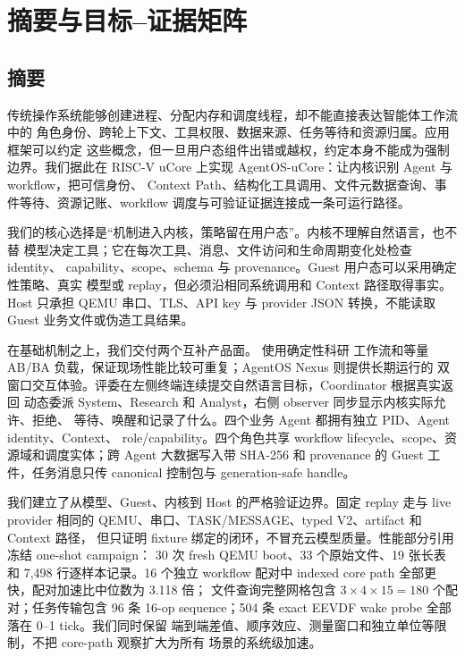 \chapter*{摘要与目标--证据矩阵}

\section*{摘要}

传统操作系统能够创建进程、分配内存和调度线程，却不能直接表达智能体工作流中的
角色身份、跨轮上下文、工具权限、数据来源、任务等待和资源归属。应用框架可以约定
这些概念，但一旦用户态组件出错或越权，约定本身不能成为强制边界。我们据此在
RISC-V uCore 上实现 AgentOS-uCore：让内核识别 Agent 与 workflow，把可信身份、
Context Path、结构化工具调用、文件元数据查询、事件等待、资源记账、workflow
调度与可验证证据连接成一条可运行路径。

我们的核心选择是“机制进入内核，策略留在用户态”。内核不理解自然语言，也不替
模型决定工具；它在每次工具、消息、文件访问和生命周期变化处检查 identity、
capability、scope、schema 与 provenance。Guest 用户态可以采用确定性策略、真实
模型或 replay，但必须沿相同系统调用和 Context 路径取得事实。Host 只承担 QEMU
串口、TLS、API key 与 provider JSON 转换，不能读取 Guest 业务文件或伪造工具结果。

在基础机制之上，我们交付两个互补产品面。 使用确定性科研
工作流和等量 AB/BA 负载，保证现场性能比较可重复；AgentOS Nexus 则提供长期运行的
双窗口交互体验。评委在左侧终端连续提交自然语言目标，Coordinator 根据真实返回
动态委派 System、Research 和 Analyst，右侧 observer 同步显示内核实际允许、拒绝、
等待、唤醒和记录了什么。四个业务 Agent 都拥有独立 PID、Agent identity、Context、
role/capability。四个角色共享 workflow lifecycle、scope、资源域和调度实体；跨 Agent 大数据写入带 SHA-256 和 provenance 的 Guest
工件，任务消息只传 canonical 控制包与 generation-safe handle。

我们建立了从模型、Guest、内核到 Host 的严格验证边界。固定 replay 走与 live
provider 相同的 QEMU、串口、TASK/MESSAGE、typed V2、artifact 和 Context 路径，
但只证明 fixture 绑定的闭环，不冒充云模型质量。性能部分引用冻结 one-shot campaign：
30 次 fresh QEMU boot、33 个原始文件、19 张长表和 7,498 行逐样本记录。16 个独立
workflow 配对中 indexed core path 全部更快，配对加速比中位数为 3.118 倍；
文件查询完整网格包含 $3\times4\times15=180$ 个配对；任务传输包含 96 条
16-op sequence；504 条 exact EEVDF wake probe 全部落在 0--1 tick。我们同时保留
端到端差值、顺序效应、测量窗口和独立单位等限制，不把 core-path 观察扩大为所有
场景的系统级加速。

